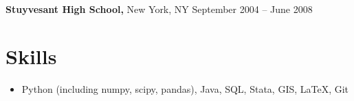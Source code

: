 \documentclass{res}
\begin{document}
\begin{resume}
  {\bf Stuyvesant High School,} New York, NY \hfill September 2004 -- June 2008

  \section{Skills}
  \begin{itemize} \itemsep -2pt
  \item Python (including numpy, scipy, pandas), Java, SQL, Stata, GIS, \LaTeX, Git
  \end{itemize}

\end{resume} 
\end{document}
